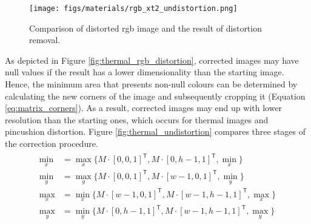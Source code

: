 \begin{figure}[ht]
	\centering
	\texttt{[image: figs/materials/rgb\_xt2\_undistortion.png]}
	\caption{Comparison of distorted \acrshort{rgb} image and the result of distortion removal.}
	\label{fig:rgb_xt2_undistortion}
\end{figure}

As depicted in Figure \ref{fig:thermal_rgb_distortion}, corrected images may have null values if the result has a lower dimensionality than the starting image. Hence, the minimum area that presents non-null colours can be determined by calculating the new corners of the image and subsequently cropping it (Equation \ref{eq:matrix_corners}). As a result, corrected images may end up with lower resolution than the starting ones, which occurs for thermal images and pincushion distortion. Figure \ref{fig:thermal_undistortion} compares three stages of the correction procedure. 
\begin{gather}
    \begin{aligned}
    \label{eq:matrix_corners}
    \min_x &= \max_x \{M \cdot [0, 0, 1]^\mathsf{T}, M \cdot [0, h - 1, 1]^\mathsf{T}, \min_x\}\\
    \min_y &= \max_y\{M \cdot [0, 0, 1]^\mathsf{T}, M \cdot [w - 1, 0, 1]^\mathsf{T}, \min_y\}\\
    \max_x &= \min_x\{M \cdot [w - 1, 0, 1]^\mathsf{T}, M \cdot [w - 1, h - 1, 1]^\mathsf{T}, \max_x\}\\
    \max_y &= \min_y\{M \cdot [0, h - 1, 1]^\mathsf{T}, M \cdot [w - 1, h - 1, 1]^\mathsf{T}, \max_y\}\\
    \end{aligned}
\end{gather}

